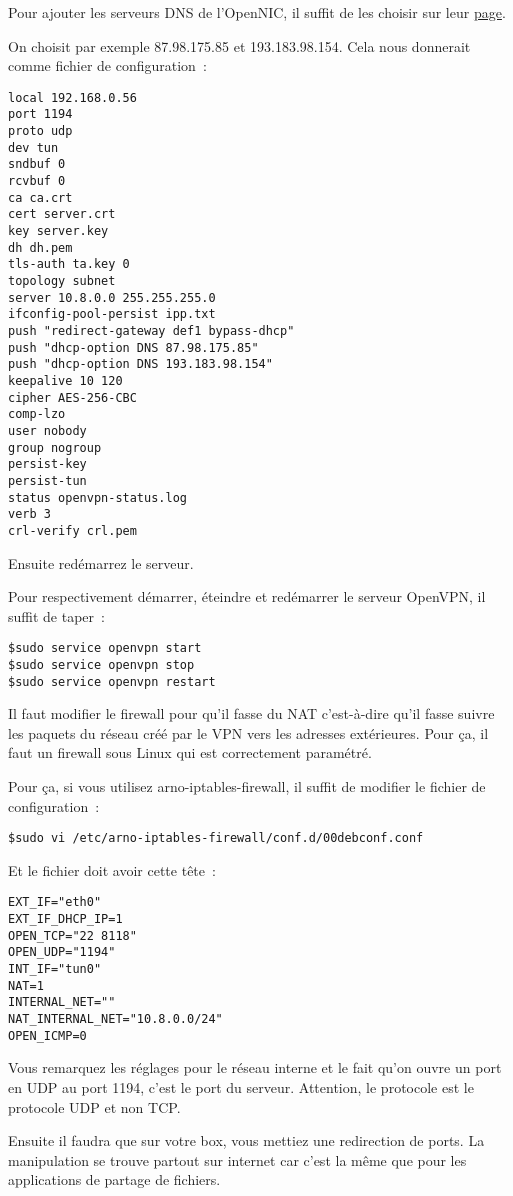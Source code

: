 Pour ajouter les serveurs DNS de l'OpenNIC, il suffit de les choisir sur leur \href{https://www.opennicproject.org/}{page}.

On choisit par exemple 87.98.175.85 et 193.183.98.154. Cela nous donnerait comme fichier de configuration~:
\begin{verbatim}
local 192.168.0.56
port 1194
proto udp
dev tun
sndbuf 0
rcvbuf 0
ca ca.crt
cert server.crt
key server.key
dh dh.pem
tls-auth ta.key 0
topology subnet
server 10.8.0.0 255.255.255.0
ifconfig-pool-persist ipp.txt
push "redirect-gateway def1 bypass-dhcp"
push "dhcp-option DNS 87.98.175.85"
push "dhcp-option DNS 193.183.98.154"
keepalive 10 120
cipher AES-256-CBC
comp-lzo
user nobody
group nogroup
persist-key
persist-tun
status openvpn-status.log
verb 3
crl-verify crl.pem
\end{verbatim}

Ensuite redémarrez le serveur.

Pour respectivement démarrer, éteindre et redémarrer le serveur OpenVPN, il suffit de taper~:
\begin{verbatim}
$sudo service openvpn start
$sudo service openvpn stop
$sudo service openvpn restart
\end{verbatim}

Il faut modifier le firewall pour qu'il fasse du NAT c'est-à-dire qu'il fasse suivre les paquets du réseau créé par le VPN vers les adresses extérieures. Pour ça, il faut un firewall sous Linux qui est correctement paramétré.

Pour ça, si vous utilisez arno-iptables-firewall, il suffit de modifier le fichier de configuration~:
\begin{verbatim}
$sudo vi /etc/arno-iptables-firewall/conf.d/00debconf.conf
\end{verbatim}

Et le fichier doit avoir cette tête~:
\begin{verbatim}
EXT_IF="eth0"
EXT_IF_DHCP_IP=1
OPEN_TCP="22 8118"
OPEN_UDP="1194"
INT_IF="tun0"
NAT=1
INTERNAL_NET=""
NAT_INTERNAL_NET="10.8.0.0/24"
OPEN_ICMP=0
\end{verbatim}

Vous remarquez les réglages pour le réseau interne et le fait qu'on ouvre un port en UDP au port 1194, c'est le port du serveur. Attention, le protocole est le protocole UDP et non TCP.

Ensuite il faudra que sur votre box, vous mettiez une redirection de ports. La manipulation se trouve partout sur internet car c'est la même que pour les applications de partage de fichiers.

